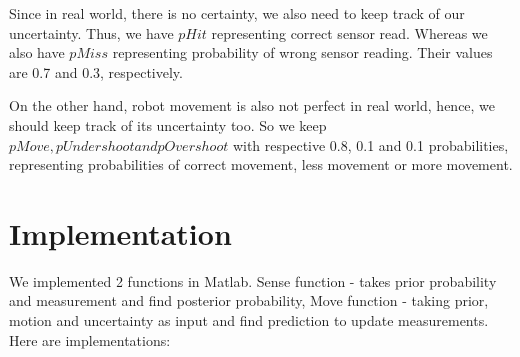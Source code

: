 \documentclass{article}
\begin{document}
\par Since in real world, there is no certainty, we also need to keep track of our uncertainty. Thus, we have $ pHit $ representing correct sensor read. Whereas we also have $ pMiss $ representing probability of wrong sensor reading. Their values are 0.7 and 0.3, respectively. 

\par On the other hand, robot movement is also not perfect in real world, hence, we should keep track of its uncertainty too. So we keep $ pMove, pUndershoot and pOvershoot $ with respective 0.8, 0.1 and 0.1 probabilities, representing probabilities of correct movement, less movement or more movement.

\section{Implementation}
\par We implemented 2 functions in Matlab. Sense function - takes prior probability and measurement and find posterior probability, Move function - taking prior, motion and uncertainty as input and find prediction to update measurements. Here are implementations:
\end{document}
